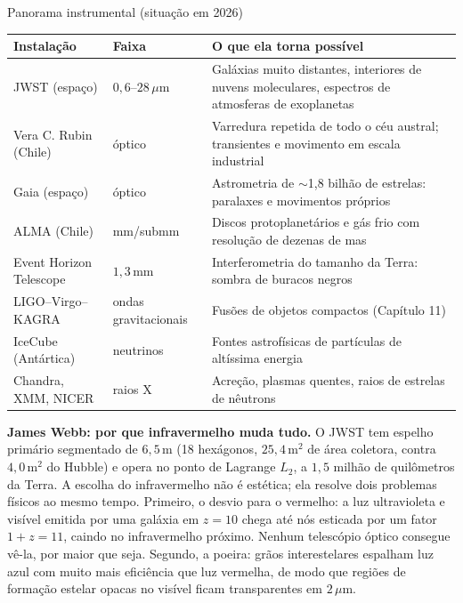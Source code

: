\documentclass[11pt,a4paper]{article}
\begin{document}
\begin{lessonblock}{Panorama instrumental (situação em 2026)}
\begin{tabular}{>{\raggedright\arraybackslash}p{}>{\raggedright\arraybackslash}p{}>{\raggedright\arraybackslash}p{}}
\toprule
Instalação & Faixa & O que ela torna possível \\
\midrule
JWST (espaço) & $0{,}6$--$28\,\mu\mathrm{m}$ & Galáxias muito distantes, interiores de nuvens moleculares, espectros de atmosferas de exoplanetas \\
Vera C. Rubin (Chile) & óptico & Varredura repetida de todo o céu austral; transientes e movimento em escala industrial \\
Gaia (espaço) & óptico & Astrometria de $\sim$1,8 bilhão de estrelas: paralaxes e movimentos próprios \\
ALMA (Chile) & mm/submm & Discos protoplanetários e gás frio com resolução de dezenas de mas \\
Event Horizon Telescope & $1{,}3\,\mathrm{mm}$ & Interferometria do tamanho da Terra: sombra de buracos negros \\
LIGO--Virgo--KAGRA & ondas gravitacionais & Fusões de objetos compactos (Capítulo 11) \\
IceCube (Antártica) & neutrinos & Fontes astrofísicas de partículas de altíssima energia \\
Chandra, XMM, NICER & raios X & Acreção, plasmas quentes, raios de estrelas de nêutrons \\
\bottomrule
\end{tabular}
\end{lessonblock}

\textbf{James Webb: por que infravermelho muda tudo.} O JWST tem espelho primário segmentado de $6{,}5\,\mathrm{m}$ (18 hexágonos, $25{,}4\,\mathrm{m^2}$ de área coletora, contra $4{,}0\,\mathrm{m^2}$ do Hubble) e opera no ponto de Lagrange $L_2$, a $1{,}5$ milhão de quilômetros da Terra. A escolha do infravermelho não é estética; ela resolve dois problemas físicos ao mesmo tempo. Primeiro, o desvio para o vermelho: a luz ultravioleta e visível emitida por uma galáxia em $z=10$ chega até nós esticada por um fator $1+z=11$, caindo no infravermelho próximo. Nenhum telescópio óptico consegue vê-la, por maior que seja. Segundo, a poeira: grãos interestelares espalham luz azul com muito mais eficiência que luz vermelha, de modo que regiões de formação estelar opacas no visível ficam transparentes em $2\,\mu\mathrm{m}$.
\end{document}
